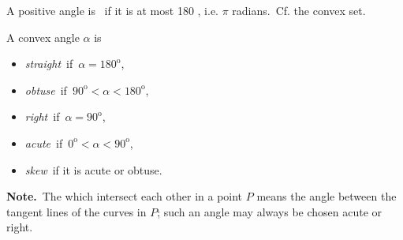 \documentclass[12pt]{article}
\begin{document}
A positive angle is \, if it is at most 180 , i.e. $\pi$ radians.\, Cf. the convex set.

A convex angle $\alpha$ is
\begin{itemize}
\item {\em straight}\, if\, $\alpha = 180^{\mathrm{o}}$,
\item {\em obtuse}\, if\, $90^{\mathrm{o}} < \alpha < 180^{\mathrm{o}}$,
\item {\em right}\, if\, $\alpha = 90^{\mathrm{o}}$,
\item {\em acute}\, if\, $0^{\mathrm{o}} < \alpha < 90^{\mathrm{o}}$,
\item {\em skew}\, if it is acute or obtuse.
\end{itemize}

\textbf{Note.}\, The  which intersect each other in a point $P$ means the angle between the tangent lines of the curves in $P$; such an angle may always be chosen acute or right.
\end{document}
